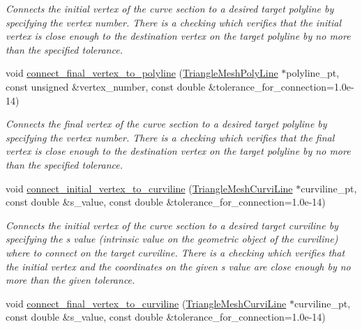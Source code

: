 \begin{DoxyCompactItemize}
\begin{DoxyCompactList}\small\item\em Connects the initial vertex of the curve section to a desired target polyline by specifying the vertex number. There is a checking which verifies that the initial vertex is close enough to the destination vertex on the target polyline by no more than the specified tolerance. \end{DoxyCompactList}\item 
void \hyperlink{classoomph_1_1TriangleMeshCurveSection_a55d06c515fd1e7f6a3729b2efda06c38}{connect\+\_\+final\+\_\+vertex\+\_\+to\+\_\+polyline} (\hyperlink{classoomph_1_1TriangleMeshPolyLine}{Triangle\+Mesh\+Poly\+Line} $\ast$polyline\+\_\+pt, const unsigned \&vertex\+\_\+number, const double \&tolerance\+\_\+for\+\_\+connection=1.\+0e-\/14)
\begin{DoxyCompactList}\small\item\em Connects the final vertex of the curve section to a desired target polyline by specifying the vertex number. There is a checking which verifies that the final vertex is close enough to the destination vertex on the target polyline by no more than the specified tolerance. \end{DoxyCompactList}\item 
void \hyperlink{classoomph_1_1TriangleMeshCurveSection_acda559ecf86d962ed1d1594e3588a87c}{connect\+\_\+initial\+\_\+vertex\+\_\+to\+\_\+curviline} (\hyperlink{classoomph_1_1TriangleMeshCurviLine}{Triangle\+Mesh\+Curvi\+Line} $\ast$curviline\+\_\+pt, const double \&s\+\_\+value, const double \&tolerance\+\_\+for\+\_\+connection=1.\+0e-\/14)
\begin{DoxyCompactList}\small\item\em Connects the initial vertex of the curve section to a desired target curviline by specifying the s value (intrinsic value on the geometric object of the curviline) where to connect on the target curviline. There is a checking which verifies that the initial vertex and the coordinates on the given s value are close enough by no more than the given tolerance. \end{DoxyCompactList}\item 
void \hyperlink{classoomph_1_1TriangleMeshCurveSection_af052734eb3a34089c6ba2c9cfb937bf3}{connect\+\_\+final\+\_\+vertex\+\_\+to\+\_\+curviline} (\hyperlink{classoomph_1_1TriangleMeshCurviLine}{Triangle\+Mesh\+Curvi\+Line} $\ast$curviline\+\_\+pt, const double \&s\+\_\+value, const double \&tolerance\+\_\+for\+\_\+connection=1.\+0e-\/14)

\end{DoxyCompactItemize}
